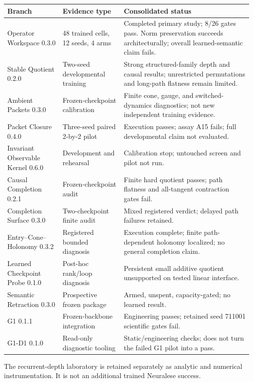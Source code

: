 \documentclass[11pt]{article}
\begin{document}
\begin{longtable}{P{0.26\textwidth}P{0.20\textwidth}P{0.45\textwidth}}
\toprule Branch & Evidence type & Consolidated status\\\midrule\endhead
Operator Workspace 0.3.0 & 48 trained cells, 12 seeds, 4 arms & Completed primary study; 8/26 gates pass. Norm preservation succeeds architecturally; overall learned-semantic claim fails.\\
Stable Quotient 0.2.0 & Two-seed developmental training & Strong structured-family depth and causal results; unrestricted permutations and long-path flatness remain limited.\\
Ambient Packets 0.3.0 & Frozen-checkpoint calibration & Finite cone, gauge, and switched-dynamics diagnostics; not new independent training evidence.\\
Packet Closure 0.4.0 & Three-seed paired 2-by-2 pilot & Execution passes; assay A15 fails; full developmental claim not evaluated.\\
Invariant Observable Kernel 0.6.0 & Development and rehearsal & Calibration stop; untouched screen and pilot not run.\\
Causal Completion 0.2.1 & Frozen-checkpoint audit & Finite hard quotient passes; path flatness and all-tangent contraction gates fail.\\
Completion Surface 0.3.0 & Two-checkpoint finite audit & Mixed registered verdict; delayed path failures retained.\\
Entry--Cone--Holonomy 0.3.2 & Registered bounded diagnosis & Execution complete; finite path-dependent holonomy localized; no general completion claim.\\
Learned Checkpoint Probe 0.1.0 & Post-hoc rank/loop diagnosis & Persistent small additive quotient unsupported on tested linear interface.\\
Semantic Retraction 0.3.0 & Prospective frozen package & Armed, unspent, capacity-gated; no learned result.\\
G1 0.1.1 & Frozen-backbone integration & Engineering passes; retained seed 711001 scientific gates fail.\\
G1-D1 0.1.0 & Read-only diagnostic tooling & Static/engineering checks; does not turn the failed G1 pilot into a pass.\\\bottomrule
\end{longtable}
The recurrent-depth laboratory is retained separately as analytic and numerical instrumentation. It is not an additional trained Neuralese success.
\end{document}
